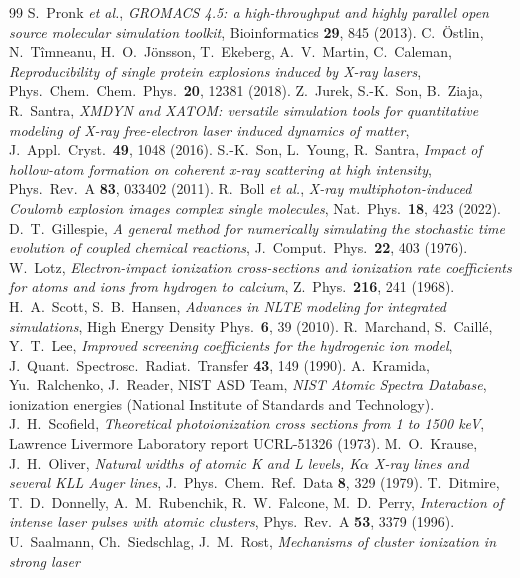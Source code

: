 \begin{thebibliography}{99}
\small
{} S.~Pronk \emph{et al.}, \emph{GROMACS 4.5: a high-throughput and highly parallel open source
molecular simulation toolkit}, Bioinformatics \textbf{29}, 845 (2013).
 C.~Östlin, N.~Tîmneanu, H.~O.~Jönsson, T.~Ekeberg, A.~V.~Martin, C.~Caleman,
\emph{Reproducibility of single protein explosions induced by X-ray lasers}, Phys.\ Chem.\ Chem.\ Phys.\ \textbf{20},
12381 (2018).
 Z.~Jurek, S.-K.~Son, B.~Ziaja, R.~Santra, \emph{XMDYN and XATOM: versatile simulation tools for
quantitative modeling of X-ray free-electron laser induced dynamics of matter}, J.\ Appl.\ Cryst.\ \textbf{49}, 1048
(2016).
 S.-K.~Son, L.~Young, R.~Santra, \emph{Impact of hollow-atom formation on coherent x-ray scattering at
high intensity}, Phys.\ Rev.\ A \textbf{83}, 033402 (2011).
 R.~Boll \emph{et al.}, \emph{X-ray multiphoton-induced Coulomb explosion images complex single
molecules}, Nat.\ Phys.\ \textbf{18}, 423 (2022).
 D.~T.~Gillespie, \emph{A general method for numerically simulating the stochastic time evolution
of coupled chemical reactions}, J.\ Comput.\ Phys.\ \textbf{22}, 403 (1976).
 W.~Lotz, \emph{Electron-impact ionization cross-sections and ionization rate coefficients for atoms
and ions from hydrogen to calcium}, Z.\ Phys.\ \textbf{216}, 241 (1968).
 H.~A.~Scott, S.~B.~Hansen, \emph{Advances in NLTE modeling for integrated simulations}, High Energy
Density Phys.\ \textbf{6}, 39 (2010).
 R.~Marchand, S.~Caill\'e, Y.~T.~Lee, \emph{Improved screening coefficients for the hydrogenic
ion model}, J.\ Quant.\ Spectrosc.\ Radiat.\ Transfer \textbf{43}, 149 (1990).
 A.~Kramida, Yu.~Ralchenko, J.~Reader, NIST ASD Team, \emph{NIST Atomic Spectra Database}, ionization
energies (National Institute of Standards and Technology).
 J.~H.~Scofield, \emph{Theoretical photoionization cross sections from 1 to 1500 keV}, Lawrence
Livermore Laboratory report UCRL-51326 (1973).
 M.~O.~Krause, J.~H.~Oliver, \emph{Natural widths of atomic K and L levels, K$\alpha$ X-ray lines and
several KLL Auger lines}, J.\ Phys.\ Chem.\ Ref.\ Data \textbf{8}, 329 (1979).
 T.~Ditmire, T.~D.~Donnelly, A.~M.~Rubenchik, R.~W.~Falcone, M.~D.~Perry, \emph{Interaction of
intense laser pulses with atomic clusters}, Phys.\ Rev.\ A \textbf{53}, 3379 (1996).
 U.~Saalmann, Ch.~Siedschlag, J.~M.~Rost, \emph{Mechanisms of cluster ionization in strong laser
}
\end{thebibliography}
